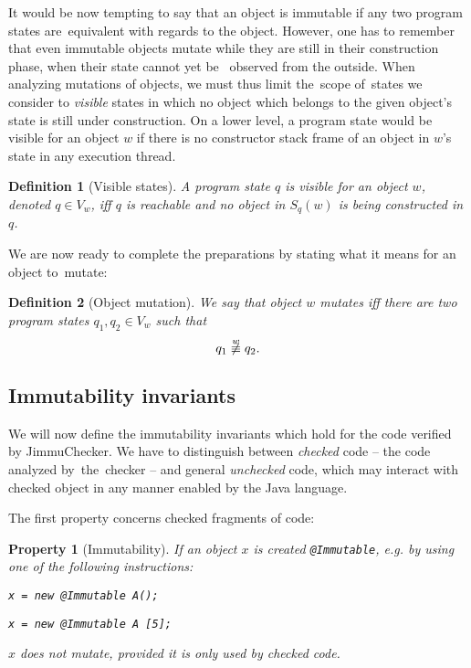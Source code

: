 \documentclass{pracamgr}
\theoremstyle{break}
\newtheorem{defi}{Definition}
\theoremstyle{break}
\newtheorem{invariant}{Property}
\theoremstyle{break}
\begin{document}
It would be now tempting to say that an object is immutable if any two
program states are~equivalent with regards to the object. However, one
has to remember that even immutable objects mutate while they are
still in their construction phase, when their state cannot yet be~
observed from the outside. When analyzing mutations of objects, we
must thus limit the~scope of~states we consider to \emph{visible}
states in which no object which belongs to the given object's state is
still under construction. On a lower level, a program state would be
visible for an object $w$ if there is no constructor stack frame of an
object in $w$'s state in any execution thread.

\begin{defi}[Visible states]
  A program state $q$ is \emph{visible} for an object $w$, denoted $q
  \in V_w$, iff $q$ is reachable and no object in $S_q(w)$ is being
  constructed in $q$.
\end{defi}

We are now ready to complete the preparations by stating what it means
for an object to~mutate:
\begin{defi}[Object mutation]
  We say that object $w$ \emph{mutates} iff there are two program
  states $q_1, q_2 \in V_w$ such that
  $$q_1 \not\stackrel{w}{\equiv} q_2.$$
\end{defi}

\subsection{Immutability invariants}
\label{sec:invariants}

We will now define the immutability invariants which hold for the code
verified by JimmuChecker. We have to distinguish between
\emph{checked} code -- the code analyzed by~the~checker -- and general
\emph{unchecked} code, which may interact with checked object in any
manner enabled by the Java language.

The first property concerns checked fragments of code:
\begin{invariant}[Immutability] \label{inv:closed}
  If an object $x$ is created \texttt{@Immutable}, e.g. by using one of
  the following instructions:
  \begin{center}
    \texttt{x = new @Immutable A();}
  \end{center}
  \begin{center}
    \texttt{x = new @Immutable A [5];}
  \end{center}
  $x$ does not mutate, provided it is only used by checked code.
\end{invariant}
\end{document}
